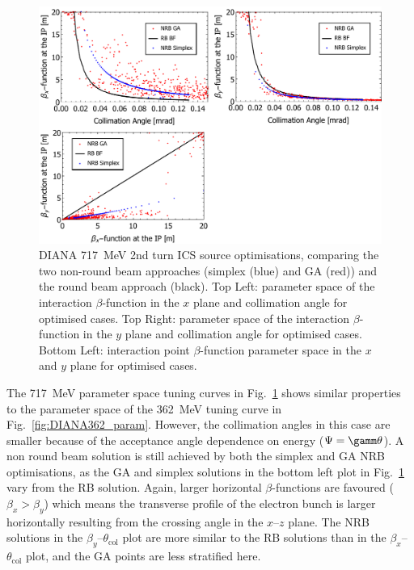 \documentclass[../main.tex]{subfiles}
\begin{document}
\begin{figure}[!h]
\centering
\includegraphics[width=\textwidth]{Figures/DIANA_Inverse_Compton_Source_Design/DIANA717param.pdf}
\caption{DIANA 717~\si{\mega\electronvolt} 2nd turn ICS source optimisations, comparing the two non-round beam approaches (simplex (blue) and GA (red)) and the round beam approach (black). Top Left: parameter space of the interaction $\beta$-function in the $x$ plane and collimation angle for optimised cases. Top Right: parameter space of the interaction $\beta$-function in the $y$ plane and collimation angle for optimised cases. Bottom Left: interaction point $\beta$-function parameter space in the $x$ and $y$ plane for optimised cases. }
\label{fig:DIANA717_param}
\end{figure}

The 717~\si{\mega\electronvolt} parameter space tuning curves in Fig.~\ref{fig:DIANA717_param} shows similar properties to the parameter space of the 362~\si{\mega\electronvolt} tuning curve in Fig.~\ref{fig:DIANA362_param}. However, the collimation angles in this case are smaller because of the acceptance angle dependence on energy ($\Psi=\gamm\theta$). A non round beam solution is still achieved by both the simplex and GA NRB optimisations, as the GA and simplex solutions in the bottom left plot in Fig.~\ref{fig:DIANA717_param} vary from the RB solution. Again, larger horizontal $\beta$-functions are favoured ($\beta_{x}>\beta_{y}$) which means the transverse profile of the electron bunch is larger horizontally resulting from the crossing angle in the $x$--$z$ plane. The NRB solutions in the $\beta_{y}$--$\theta_{\mathrm{col}}$ plot are more similar to the RB solutions than in the $\beta_{x}$--$\theta_{\mathrm{col}}$ plot, and the GA points are less stratified here.    
\end{document}
